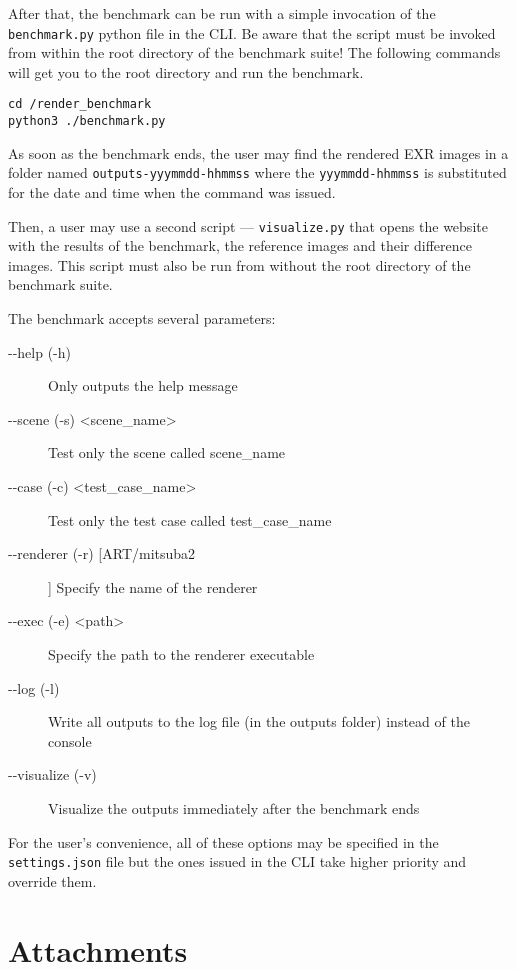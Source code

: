 \documentclass[12pt,a4paper]{report}
\begin{document}
After that, the benchmark can be run with a simple invocation of the \texttt{benchmark.py} python file in the CLI. Be aware that the script must be invoked from within the root directory of the benchmark suite! The following commands will get you to the root directory and run the benchmark.

\begin{lstlisting}
cd /render_benchmark
python3 ./benchmark.py
\end{lstlisting}

As soon as the benchmark ends, the user may find the rendered EXR images in a folder named \texttt{outputs-yyymmdd-hhmmss} where the \texttt{yyymmdd-hhmmss} is substituted for the date and time when the command was issued.

Then, a user may use a second script --- \texttt{visualize.py} that opens the website with the results of the benchmark, the reference images and their difference images. This script must also be run from without the root directory of the benchmark suite.

The benchmark accepts several parameters:
\begin{description}
	\item[-{}-help (-h)] Only outputs the help message
	\item[-{}-scene (-s) \textless scene\_name\textgreater] Test only the scene called scene\_name
	\item[-{}-case (-c) \textless test\_case\_name\textgreater] Test only the test case called test\_case\_name
	\item[-{}-renderer (-r) [ART/mitsuba2]] Specify the name of the renderer 
	\item[-{}-exec (-e) \textless path\textgreater] Specify the path to the renderer executable
	\item[-{}-log (-l)] Write all outputs to the log file (in the outputs folder) instead of the console
	\item[-{}-visualize (-v)] Visualize the outputs immediately after the benchmark ends
\end{description}

For the user's convenience, all of these options may be specified in the \texttt{settings.json} file but the ones issued in the CLI take higher priority and override them.

\chapter{Attachments}
\end{document}
